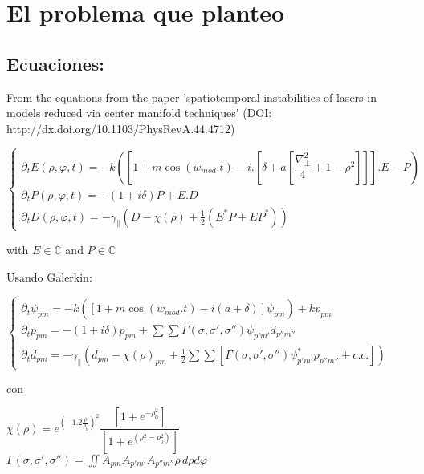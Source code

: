 \section{El problema que planteo}
	
	\subsection{Ecuaciones:} 
	
	
	From the equations from the paper 'spatiotemporal instabilities of lasers in models reduced via center manifold techniques' (DOI: http://dx.doi.org/10.1103/PhysRevA.44.4712)
	
	\[
	\begin{cases}
	\partial_t E(\rho,\varphi,t)=-k\left([1+m\cos(w_{mod}.t)-i.\left[\delta+a\left[\dfrac{\nabla^2_{\bot}}{4}+1-\rho^2\right]\right]].E-P\right)\\
	\partial_t P(\rho,\varphi,t)=-(1+i\delta)P+E.D\\
	\partial_t D(\rho,\varphi,t)=-\gamma_{\parallel}(D-\chi(\rho)+\frac{1}{2}(E^*P+EP^*))
	\end{cases}
	\]
	
	with $E \in \mathbb{C}$ and $P \in \mathbb{C}$
	
	Usando Galerkin:
	
	$\begin{cases}
	\partial_t \psi_{pm}=-k\left( \left[1+m\cos(w_{mod}.t)- i(a +\delta) \right]\psi_{pm}\right)+k p_{pm}\\
	\partial_t p_{pm}=-(1+i\delta)p_{pm}+\sum\sum \Gamma (\sigma, \sigma', \sigma'') \psi_{p'm'}d_{p''m''}\\
	\partial_t d_{pm}=-\gamma_{\parallel}(d_{pm}-\chi(\rho)_{pm}+\tfrac{1}{2}\sum\sum [\Gamma (\sigma, \sigma', \sigma'') \psi_{p'm'}^*p_{p''m''} + c.c.])
	\end{cases}$
	
	con
	
	$\chi(\rho)=e^{(-1.2 \frac{\rho}{\rho_0})^2}\dfrac{[1+e^{-\rho_0^2}]}{[1+e^{(\rho^2-\rho_0^2)}]}$\\
	$\Gamma (\sigma, \sigma', \sigma'')=\iint A_{pm}A_{p'm'}A_{p''m''}\rho \, d\!\rho d\!\varphi  $
	